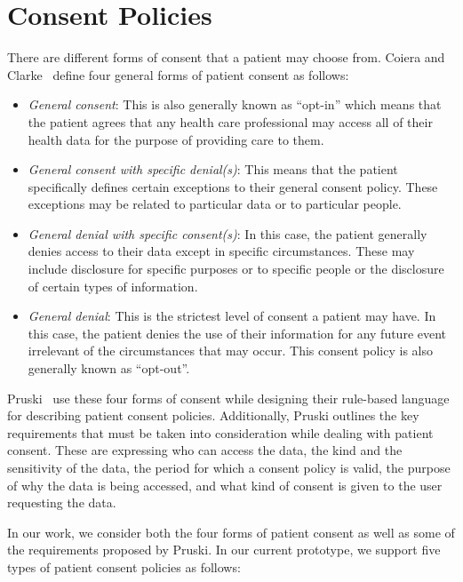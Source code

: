 \documentclass[conference]{IEEEtran}
\begin{document}
\section{Consent Policies}
\label{cons-polic}

There are different forms of consent that a patient may choose from. Coiera and Clarke~\cite{coiera2004consent} define four general forms of patient consent as
follows:

\begin{itemize}
 \item \textit{General consent}: This is also generally known as ``opt-in'' which means that the patient agrees that any health care professional may access
all of their health data for the purpose of providing care to them.
\item \textit{General consent with specific denial(s)}: This means that the patient specifically defines certain exceptions to their general consent policy.
These exceptions may be related to particular data or to particular people.
\item \textit{General denial with specific consent(s)}: In this case, the patient generally denies access to their data except in specific circumstances. These
may include disclosure for specific purposes or to specific people or the disclosure of certain types of information.
\item \textit{General denial}: This is the strictest level of consent a patient may have. In this case, the patient denies the use of their information for any
future event irrelevant of the circumstances that may occur. This consent policy is also generally known as ``opt-out''.
\end{itemize}

Pruski~\cite{pruski2010} use these four forms of consent while designing their rule-based language for describing patient consent policies. Additionally,
Pruski outlines the key requirements that must be taken into consideration while dealing with patient consent. These are expressing who can access the data,
the kind and the sensitivity of the data, the period for which a consent policy is valid, the purpose of why the data is being accessed, and what kind of
consent is given to the user requesting the data. 

In our work, we consider both the four forms of patient consent as well as some of the requirements proposed by Pruski. In our current prototype, we support
five types of patient consent policies as follows:
\end{document}
